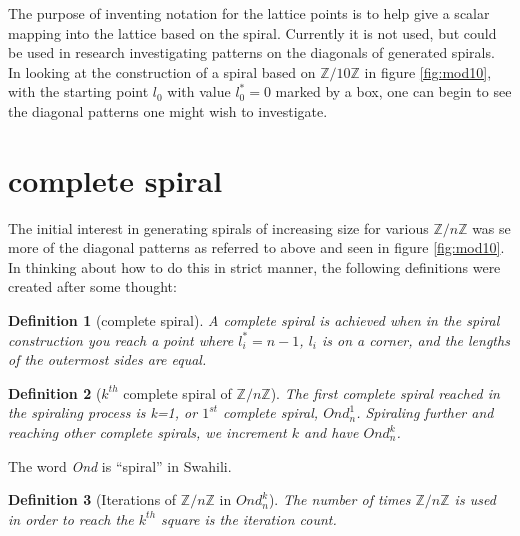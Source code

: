 \documentclass[11pt]{amsart}
\theoremstyle{mydef}
\newtheorem{definition}{Definition}
\begin{document}
The purpose of inventing notation for the lattice points is to help give a scalar mapping into the lattice based on the spiral. Currently it is not used, but could be used in research investigating patterns on the diagonals of generated spirals. In looking at the construction of a spiral based on $\mathbb{Z}/10\mathbb{Z}$ in figure \ref{fig:mod10}, with the starting point $l_0$ with value $l^*_0 = 0$ marked by a box, one can begin to see the diagonal patterns one might wish to investigate.


\section{complete spiral}
The initial interest in generating spirals of increasing size for various $\mathbb{Z}/n\mathbb{Z}$ was se more of the diagonal patterns as referred to above and seen in figure \ref{fig:mod10}. In thinking about how to do this in strict manner, the following definitions were created after some thought:

\begin{definition}[complete spiral]
A complete spiral is achieved when in the spiral construction you reach a point where $l^*_i = n-1$, $l_i$ is on a corner, and the lengths of the outermost sides are equal.
\end{definition}

\begin{definition}[$k^{th}$ complete spiral of $\mathbb{Z}/n\mathbb{Z}$]
The first complete spiral reached in the spiraling process is k=1, or $1^{st}$ complete spiral,  $Ond^1_n$. Spiraling further and reaching other complete spirals, we increment $k$ and have $Ond^k_n$.
\end{definition}

The word \textit{Ond} is ``spiral'' in Swahili.

\begin{definition}[Iterations of  $\mathbb{Z}/n\mathbb{Z}$ in $Ond^k_n$]
The number of times $\mathbb{Z}/n\mathbb{Z}$ is used in order to reach the $k^{th}$ square is the iteration count.
\end{definition}
\end{document}

